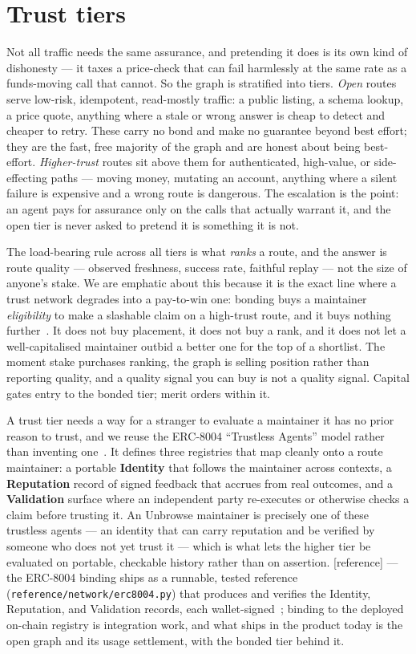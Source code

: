 \documentclass[11pt]{article}
\newcommand{\refimpl}{\textcolor{blue!70!black}{\small[reference]}}
\begin{document}
\section{Trust tiers}

Not all traffic needs the same assurance, and pretending it does is its own kind of
dishonesty --- it taxes a price-check that can fail harmlessly at the same rate as a
funds-moving call that cannot. So the graph is stratified into tiers. \emph{Open}
routes serve low-risk, idempotent, read-mostly traffic: a public listing, a
schema lookup, a price quote, anything where a stale or wrong answer is cheap to
detect and cheaper to retry. These carry no bond and make no guarantee beyond
best effort; they are the fast, free majority of the graph and are honest about
being best-effort. \emph{Higher-trust} routes sit above them for authenticated,
high-value, or side-effecting paths --- moving money, mutating an account, anything
where a silent failure is expensive and a wrong route is dangerous. The escalation
is the point: an agent pays for assurance only on the calls that actually warrant
it, and the open tier is never asked to pretend it is something it is not.

The load-bearing rule across all tiers is what \emph{ranks} a route, and the answer
is route quality --- observed freshness, success rate, faithful replay --- not the
size of anyone's stake. We are emphatic about this because it is the exact line
where a trust network degrades into a pay-to-win one: bonding buys a maintainer
\emph{eligibility} to make a slashable claim on a high-trust route, and it buys
nothing further~\cite{internalapis}. It does not buy placement, it does not buy a
rank, and it does not let a well-capitalised maintainer outbid a better one for the
top of a shortlist. The moment stake purchases ranking, the graph is selling
position rather than reporting quality, and a quality signal you can buy is not a
quality signal. Capital gates entry to the bonded tier; merit orders within it.

A trust tier needs a way for a stranger to evaluate a maintainer it has no prior
reason to trust, and we reuse the ERC-8004 ``Trustless Agents'' model rather than
inventing one~\cite{erc8004}. It defines three registries that map cleanly onto a
route maintainer: a portable \textbf{Identity} that follows the maintainer across
contexts, a \textbf{Reputation} record of signed feedback that accrues from real
outcomes, and a \textbf{Validation} surface where an independent party re-executes
or otherwise checks a claim before trusting it. An Unbrowse maintainer is precisely
one of these trustless agents --- an identity that can carry reputation and be
verified by someone who does not yet trust it --- which is what lets the higher
tier be evaluated on portable, checkable history rather than on assertion. \refimpl{}
--- the ERC-8004 binding ships as a runnable, tested reference
(\texttt{reference/network/erc8004.py}) that produces and verifies the Identity,
Reputation, and Validation records, each wallet-signed~\cite{erc8004}; binding to
the deployed on-chain registry is integration work, and what ships in the product
today is the open graph and its usage settlement, with the bonded tier behind it.
\end{document}
